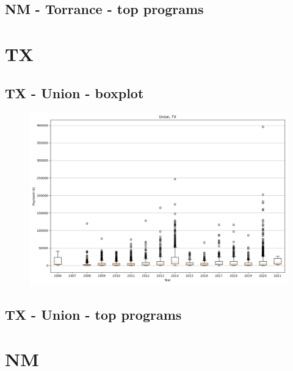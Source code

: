 \subsection*{NM - Torrance - top programs}

\newpage
\section*{TX}
\subsection*{TX - Union - boxplot}
\begin{figure}[h]
\centering
\includegraphics[width=7in]{../output/boxplots/counties/Union-TX_boxplot.png}
\end{figure}


\subsection*{TX - Union - top programs}

\newpage
\section*{NM}
